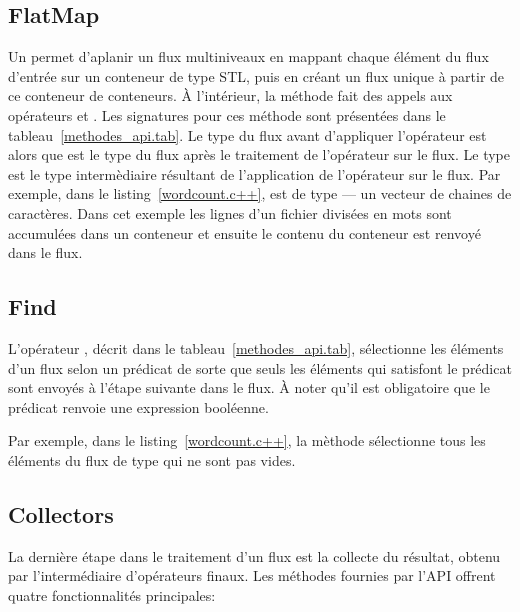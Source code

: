 \subsection{FlatMap}

Un   permet d'aplanir un flux multiniveaux en mappant chaque \'el\'ement du flux d'entr\'ee sur un conteneur de type STL, puis en cr\'eant un flux unique \`a partir de ce conteneur de conteneurs. \`A l'int\'erieur, la m\'ethode  fait des appels aux op\'erateurs  et . Les  signatures pour ces m\'ethode sont pr\'esent\'ees dans le tableau~\ref{methodes_api.tab}. Le type du flux avant d'appliquer l'op\'erateur  est  alors que  est le type du flux apr\`es le traitement de l'op\'erateur sur le flux. Le type  est le type interm\`ediaire r\'esultant de l'application de l'op\'erateur  sur le flux. Par exemple, dans le listing~\ref{wordcount.c++},  est de type  --- un vecteur de chaines de caract\`eres. Dans cet exemple les lignes d'un fichier divis\'ees en mots sont accumul\'ees dans un conteneur et ensuite le contenu du conteneur est renvoy\'e dans le flux.


\subsection{Find}

L'op\'erateur , d\'ecrit dans le tableau~\ref{methodes_api.tab}, s\'electionne les \'el\'ements d'un flux selon un pr\'edicat de sorte que seuls les \'el\'ements qui  satisfont le pr\'edicat sont envoy\'es \`a l'\'etape suivante dans le flux. \`A noter qu'il est obligatoire que le pr\'edicat renvoie une expression bool\'eenne. 


Par exemple, 
dans le listing~\ref{wordcount.c++}, la m\`ethode  s\'electionne tous les \'el\'ements du flux de type  qui ne sont pas vides.


\subsection{Collectors}

La derni\`ere \'etape dans le traitement d'un flux est la collecte du r\'esultat, obtenu par l'interm\'ediaire d'op\'erateurs finaux. Les m\'ethodes fournies par l'API offrent quatre fonctionnalit\'es principales: 

